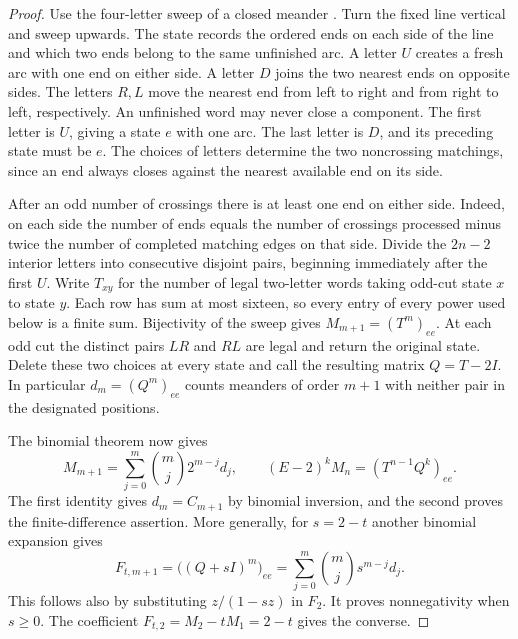 \begin{proof}
Use the four-letter sweep of a closed meander
\cite{Jensen,AP}. Turn the fixed line vertical and sweep upwards.
The state records the ordered ends on each side of the line and which
two ends belong to the same unfinished arc. A letter \(U\) creates a
fresh arc with one end on either side. A letter \(D\) joins the two
nearest ends on opposite sides. The letters \(R,L\) move the nearest
end from left to right and from right to left, respectively.
An unfinished word may never close a component. The first letter is
\(U\), giving a state \(e\) with one arc. The last letter is \(D\),
and its preceding state must be \(e\). The choices of letters determine
the two noncrossing matchings, since an end always closes against the
nearest available end on its side.

After an odd number of crossings there is at least one end on either
side. Indeed, on each side the number of ends equals the number of
crossings processed minus twice the number of completed matching edges
on that side. Divide the \(2n-2\) interior letters into consecutive
disjoint pairs, beginning immediately after the first \(U\). Write
\(T_{xy}\) for the number of legal two-letter words taking odd-cut
state \(x\) to state \(y\). Each row has sum at most sixteen, so every
entry of every power used below is a finite sum. Bijectivity of the
sweep gives \(M_{m+1}=(T^m)_{ee}\). At each odd cut the distinct pairs
\(LR\) and \(RL\) are legal and return the original state. Delete these
two choices at every state and call the resulting matrix \(Q=T-2I\).
In particular \(d_m=(Q^m)_{ee}\) counts meanders of order \(m+1\)
with neither pair in the designated positions.

The binomial theorem now gives
\[
   M_{m+1}=\sum_{j=0}^m\binom mj 2^{m-j}d_j,\qquad
   (E-2)^kM_n=(T^{n-1}Q^k)_{ee}.
\]
The first identity gives \(d_m=C_{m+1}\) by binomial inversion, and
the second proves the finite-difference assertion. More generally, for
\(s=2-t\) another binomial expansion gives
\begin{equation}\label{eq:idle-weight}
   F_{t,m+1}=\big((Q+sI)^m\big)_{ee}
            =\sum_{j=0}^m\binom mj s^{m-j}d_j .
\end{equation}
This follows also by substituting \(z/(1-sz)\) in \(F_2\).
It proves nonnegativity when \(s\ge0\). The coefficient
\(F_{t,2}=M_2-tM_1=2-t\) gives the converse.


\end{proof}
